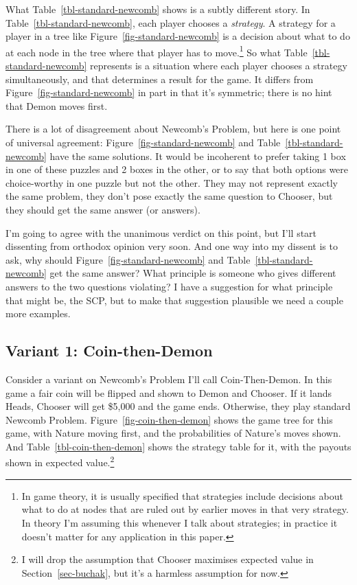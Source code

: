 \documentclass[
  10pt,
  letterpaper,
  DIV=11,
  numbers=noendperiod,
  twoside]{scrartcl}
\begin{document}
What Table~\ref{tbl-standard-newcomb} shows is a subtly different story.
In Table~\ref{tbl-standard-newcomb}, each player chooses a
\emph{strategy}. A strategy for a player in a tree like
Figure~\ref{fig-standard-newcomb} is a decision about what to do at each
node in the tree where that player has to move.\footnote{In game theory,
  it is usually specified that strategies include decisions about what
  to do at nodes that are ruled out by earlier moves in that very
  strategy. In theory I'm assuming this whenever I talk about
  strategies; in practice it doesn't matter for any application in this
  paper.} So what Table~\ref{tbl-standard-newcomb} represents is a
situation where each player chooses a strategy simultaneously, and that
determines a result for the game. It differs from
Figure~\ref{fig-standard-newcomb} in part in that it's symmetric; there
is no hint that Demon moves first.

There is a lot of disagreement about Newcomb's Problem, but here is one
point of universal agreement: Figure~\ref{fig-standard-newcomb} and
Table~\ref{tbl-standard-newcomb} have the same solutions. It would be
incoherent to prefer taking 1 box in one of these puzzles and 2 boxes in
the other, or to say that both options were choice-worthy in one puzzle
but not the other. They may not represent exactly the same problem, they
don't pose exactly the same question to Chooser, but they should get the
same answer (or answers).

I'm going to agree with the unanimous verdict on this point, but I'll
start dissenting from orthodox opinion very soon. And one way into my
dissent is to ask, why should Figure~\ref{fig-standard-newcomb} and
Table~\ref{tbl-standard-newcomb} get the same answer? What principle is
someone who gives different answers to the two questions violating? I
have a suggestion for what principle that might be, the SCP, but to make
that suggestion plausible we need a couple more examples.

\subsection{Variant 1: Coin-then-Demon}\label{variant-1-coin-then-demon}

Consider a variant on Newcomb's Problem I'll call Coin-Then-Demon. In
this game a fair coin will be flipped and shown to Demon and Chooser. If
it lands Heads, Chooser will get \$5,000 and the game ends. Otherwise,
they play standard Newcomb Problem. Figure~\ref{fig-coin-then-demon}
shows the game tree for this game, with Nature moving first, and the
probabilities of Nature's moves shown. And
Table~\ref{tbl-coin-then-demon} shows the strategy table for it, with
the payouts shown in expected value.\footnote{I will drop the assumption
  that Chooser maximises expected value in Section~\ref{sec-buchak}, but
  it's a harmless assumption for now.}
\end{document}

